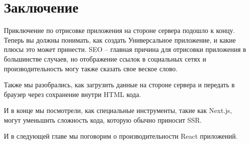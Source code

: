 \section{Заключение}

Приключение по отрисовке приложения на стороне сервера подошло к концу. Теперь вы должны понимать, как создать Универсальное приложение, и какие плюсы это может принести. SEO -- главная причина для отрисовки приложения в большинстве случаев, но отображение ссылок в социальных сетях и производительность могу также сказать свое веское слово.

Также мы разобрались, как загрузить данные на стороне сервера и передать в браузер через сохранение внутри HTML кода.

И в конце мы посмотрели, как специальные инструменты, такие как Next.js, могут уменьшить сложность кода, которую обычно приносит SSR.

И в следующей главе мы поговорим о производительности React приложений.






